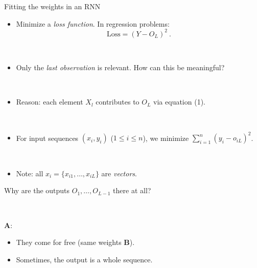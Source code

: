 \documentclass[
  10pt,
  ignorenonframetext,
]{beamer}
\providecommand{\tightlist}{%
  \setlength{\itemsep}{0pt}\setlength{\parskip}{0pt}}
\begin{document}
\begin{frame}
\begin{block}{Fitting the weights in an RNN}
\protect\hypertarget{fitting-the-weights-in-an-rnn}{}
\(~\)

\begin{itemize}
\tightlist
\item
  Minimize a \emph{loss function}. In regression problems:
  \[\text{Loss} = (Y- O_L)^2 \ . \]
\end{itemize}

\(~\)

\begin{itemize}
\tightlist
\item
  Only the \emph{last observation} is relevant. How can this be
  meaningful?
\end{itemize}

\(~\)

\begin{itemize}
\tightlist
\item
  Reason: each element \(X_l\) contributes to \(O_L\) via equation (1).
\end{itemize}

\(~\)

\begin{itemize}
\tightlist
\item
  For input sequences \((x_i,y_i)\) (\(1\leq i \leq n\)), we minimize
  \(\sum_{i=1}^n (y_i - o_{iL})^2\).
\end{itemize}

\(~\)

\begin{itemize}
\tightlist
\item
  Note: all \(x_i = \{ x_{i1}, \ldots, x_{iL} \}\) are \emph{vectors}.
\end{itemize}
\end{block}
\end{frame}

\begin{frame}
Why are the outputs \(O_1, \ldots, O_{L-1}\) there at all?

\(~\)

\pause

\textbf{A}:

\begin{itemize}
\item
  They come for free (same weights \(\boldsymbol{B}\)).
\item
  Sometimes, the output is a whole sequence.
\end{itemize}
\end{frame}
\end{document}
